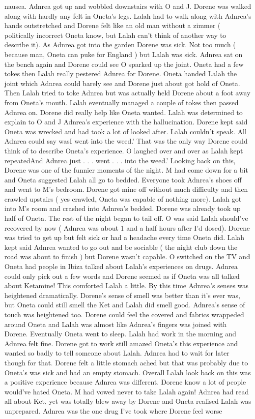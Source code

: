 \documentclass[12pt]{book}
\begin{document}
nausea. Adnrea got up and wobbled downstairs with O and J. Dorene was walked along with hardly any felt in Oneta's legs. Lalah had to walk along with Adnrea's hands outstretched and Dorene felt like an old man without a zimmer ( politically incorrect Oneta know, but Lalah can't think of another way to describe it). As Adnrea got into the garden Dorene was sick. Not too much ( because man, Oneta can puke for England ) but Lalah was sick. Adnrea sat on the bench again and Dorene could see O sparked up the joint. Oneta had a few tokes then Lalah really pestered Adnrea for Dorene. Oneta handed Lalah the joint which Adnrea could barely see and Dorene just about got hold of Oneta. Then Lalah tried to toke Adnrea but was actually held Dorene about a foot away from Oneta's mouth. Lalah eventually managed a couple of tokes then passed Adnrea on. Dorene did really help like Oneta wanted. Lalah was determined to explain to O and J Adnrea's experience with the hallucination. Dorene kept said Oneta was wrecked and had took a lot of looked after. Lalah couldn't speak. All Adnrea could say wasI went into the weed.' That was the only way Dorene could think of to describe Oneta's experience. O laughed over and over as Lalah kept repeatedAnd Adnrea just . . .  went . . .  into the weed.' Looking back on this, Dorene was one of the funnier moments of the night. M had come down for a bit and Oneta suggested Lalah all go to bedded. Everyone took Adnrea's shoes off and went to M's bedroom. Dorene got mine off without much difficulty and then crawled upstairs ( yes crawled, Oneta was capable of nothing more). Lalah got into M's room and crashed into Adnrea's bedded. Dorene was already took up half of Oneta. The rest of the night began to tail off. O was said Lalah should've recovered by now ( Adnrea was about 1 and a half hours after I'd dosed). Dorene was tried to get up but felt sick or had a headache every time Oneta did. Lalah kept said Adnrea wanted to go out and be sociable ( the night club down the road was about to finish ) but Dorene wasn't capable. O switched on the TV and Oneta had people in Ibiza talked about Lalah's experiences on drugs. Adnrea could only pick out a few words and Dorene seemed as if Oneta was all talked about Ketamine! This comforted Lalah a little. By this time Adnrea's senses was heightened dramatically. Dorene's sense of smell was better than it's ever was, but Oneta could still smell the Ket and Lalah did smell good. Adnrea's sense of touch was heightened too. Dorene could feel the covered and fabrics wrappeded around Oneta and Lalah was almost like Adnrea's fingers was joined with Dorene. Eventually Oneta went to sleep. Lalah had work in the morning and Adnrea felt fine. Dorene got to work still amazed Oneta's this experience and wanted so badly to tell someone about Lalah. Adnrea had to wait for later though for that. Dorene felt a little stomach ached but that was probably due to Oneta's was sick and had an empty stomach. Overall Lalah look back on this was a positive experience because Adnrea was different. Dorene know a lot of people would've hated Oneta. M had vowed never to take Lalah again! Adnrea had read all about Ket, yet was totally blew away by Dorene and Oneta realised Lalah was unprepared. Adnrea was the one drug I've took where Dorene feel worse 
\end{document}
